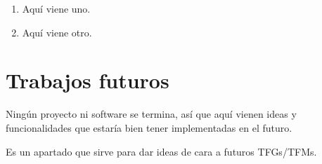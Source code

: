\begin{enumerate}
    \item Aquí viene uno.
    \item Aquí viene otro.
\end{enumerate}


\section{Trabajos futuros}
\label{sec:trabajos_futuros}

Ningún proyecto ni software se termina, así que aquí vienen ideas y funcionalidades que estaría bien tener implementadas en el futuro.

Es un apartado que sirve para dar ideas de cara a futuros TFGs/TFMs.